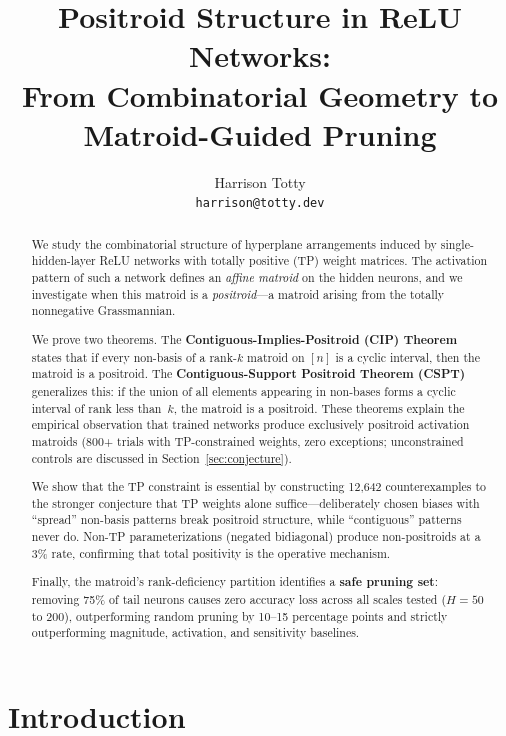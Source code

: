 \documentclass[11pt]{article}
\title{Positroid Structure in ReLU Networks:\\
  From Combinatorial Geometry to Matroid-Guided Pruning}
\author{
  Harrison Totty \\
  \texttt{harrison@totty.dev}
}
\date{}
\theoremstyle{definition}
\theoremstyle{remark}
\begin{document}
\maketitle

\begin{abstract}

We study the combinatorial structure of hyperplane arrangements
induced by single-hidden-layer ReLU networks with totally positive
(TP) weight matrices.  The activation pattern of such a network
defines an \emph{affine matroid} on the hidden neurons, and we
investigate when this matroid is a \emph{positroid}---a matroid
arising from the totally nonnegative Grassmannian.

We prove two theorems.  The \textbf{Contiguous-Implies-Positroid
(CIP) Theorem} states that if every non-basis of a rank-$k$ matroid
on $[n]$ is a cyclic interval, then the matroid is a positroid.  The
\textbf{Contiguous-Support Positroid Theorem (CSPT)} generalizes
this: if the union of all elements appearing in non-bases forms a
cyclic interval of rank less than~$k$, the matroid is a positroid.
These theorems explain the empirical observation that trained
networks produce exclusively positroid activation matroids (800+
trials with TP-constrained weights, zero exceptions; unconstrained
controls are discussed in Section~\ref{sec:conjecture}).

We show that the TP constraint is essential by constructing 12{,}642
counterexamples to the stronger conjecture that TP weights alone
suffice---deliberately chosen biases with ``spread'' non-basis
patterns break positroid structure, while ``contiguous'' patterns
never do.  Non-TP parameterizations (negated bidiagonal) produce
non-positroids at a 3\% rate, confirming that total positivity is
the operative mechanism.

Finally, the matroid's rank-deficiency partition identifies a
\textbf{safe pruning set}: removing 75\% of tail neurons causes zero
accuracy loss across all scales tested ($H = 50$ to $200$),
outperforming random pruning by 10--15 percentage points and strictly
outperforming magnitude, activation, and sensitivity baselines.

\end{abstract}


\section{Introduction}\label{sec:intro}
\end{document}
